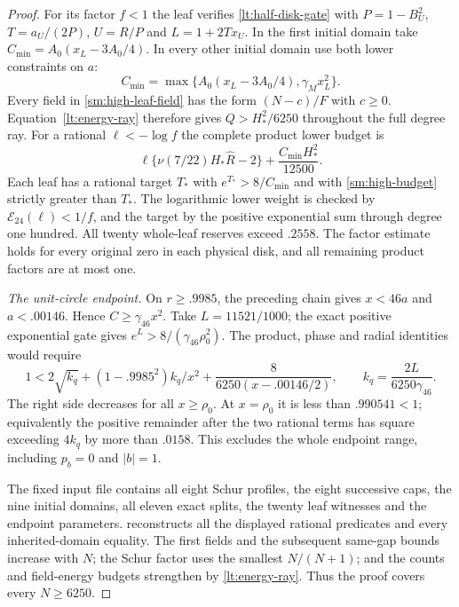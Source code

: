 \begin{proof}
For its factor $f<1$ the leaf verifies
\eqref{lt:half-disk-gate} with $P=1-B_U^2$,
$T=a_U/(2P)$, $U=R/P$ and $L=1+2Tx_U$.
In the first initial domain take $C_{\min}=A_0(x_L-3A_0/4)$.
In every other initial domain use both lower constraints on
$a$:
\[
 C_{\min}=\max\{A_0(x_L-3A_0/4),\gamma_Mx_L^2\}.
\]
Every field in \eqref{sm:high-leaf-field} has the form $(N-c)/F$
with $c\ge0$. Equation~\eqref{lt:energy-ray} therefore gives
$Q>H_*^2/6250$ throughout the full degree ray. For a rational
$\ell<-\log f$ the complete product lower budget is
\begin{equation}\label{sm:high-budget}
 \ell\{\nu(7/22)H_*\widehat R-2\}
       +\frac{C_{\min}H_*^2}{12500}.
\end{equation}
Each leaf has a rational target $T_*$ with
$e^{T_*}>8/C_{\min}$ and with
\eqref{sm:high-budget} strictly greater than $T_*$.
The logarithmic lower weight is checked by
$\mathcal E_{24}(\ell)<1/f$, and the target by the positive
exponential sum through degree one hundred. All twenty whole-leaf
reserves exceed $.2558$. The factor estimate holds for every
original zero in each physical disk, and all remaining product
factors are at most one.

\smallskip\noindent\emph{The unit-circle endpoint.}
On $r\ge.9985$, the preceding chain gives $x<46a$ and
$a<.00146$. Hence $C\ge\gamma_{46}x^2$.
Take $L=11521/1000$; the exact positive exponential gate gives
$e^L>8/(\gamma_{46}\rho_0^2)$.
The product, phase and radial identities would require
\[
 1<2\sqrt{k_q}+(1-.9985^2)k_q/x^2
                 +\frac8{6250(x-.00146/2)},\qquad
 k_q=\frac{2L}{6250\gamma_{46}}.
\]
The right side decreases for all $x\ge\rho_0$. At $x=\rho_0$
it is less than $.990541<1$; equivalently the positive remainder
after the two rational terms has square exceeding $4k_q$ by more
than $.0158$. This excludes the whole endpoint range, including
$p_b=0$ and $|b|=1$.

The fixed input file contains all eight Schur profiles, the eight
successive caps, the nine initial domains, all eleven exact splits,
the twenty leaf witnesses and the endpoint parameters.
 reconstructs all the displayed
rational predicates and every inherited-domain equality.
The first fields and the subsequent same-gap bounds increase with
$N$; the Schur factor uses the smallest $N/(N+1)$; and the counts
and field-energy budgets strengthen by \eqref{lt:energy-ray}.
Thus the proof covers every $N\ge6250$.
\end{proof}
